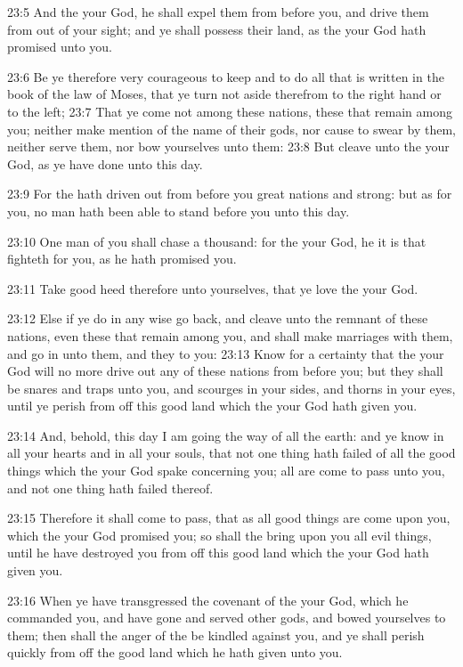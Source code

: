 23:5 And the \LORD your God, he shall expel them from before you, and
drive them from out of your sight; and ye shall possess their land, as
the \LORD your God hath promised unto you.

23:6 Be ye therefore very courageous to keep and to do all that is
written in the book of the law of Moses, that ye turn not aside
therefrom to the right hand or to the left; 23:7 That ye come not
among these nations, these that remain among you; neither make mention
of the name of their gods, nor cause to swear by them, neither serve
them, nor bow yourselves unto them: 23:8 But cleave unto the \LORD your
God, as ye have done unto this day.

23:9 For the \LORD hath driven out from before you great nations and
strong: but as for you, no man hath been able to stand before you unto
this day.

23:10 One man of you shall chase a thousand: for the \LORD your God, he
it is that fighteth for you, as he hath promised you.

23:11 Take good heed therefore unto yourselves, that ye love the \LORD
your God.

23:12 Else if ye do in any wise go back, and cleave unto the remnant
of these nations, even these that remain among you, and shall make
marriages with them, and go in unto them, and they to you: 23:13 Know
for a certainty that the \LORD your God will no more drive out any of
these nations from before you; but they shall be snares and traps unto
you, and scourges in your sides, and thorns in your eyes, until ye
perish from off this good land which the \LORD your God hath given you.

23:14 And, behold, this day I am going the way of all the earth: and
ye know in all your hearts and in all your souls, that not one thing
hath failed of all the good things which the \LORD your God spake
concerning you; all are come to pass unto you, and not one thing hath
failed thereof.

23:15 Therefore it shall come to pass, that as all good things are
come upon you, which the \LORD your God promised you; so shall the \LORD
bring upon you all evil things, until he have destroyed you from off
this good land which the \LORD your God hath given you.

23:16 When ye have transgressed the covenant of the \LORD your God,
which he commanded you, and have gone and served other gods, and bowed
yourselves to them; then shall the anger of the \LORD be kindled
against you, and ye shall perish quickly from off the good land which
he hath given unto you.

